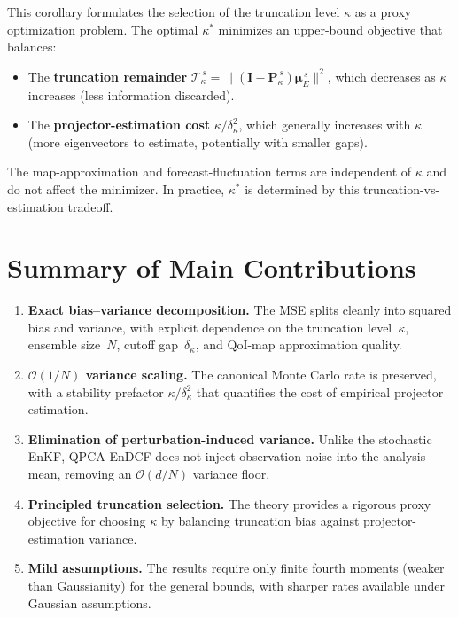 \documentclass[11pt]{article}
\begin{document}
This corollary formulates the selection of the truncation level $\kappa$ as a
proxy optimization problem. The optimal $\kappa^\ast$ minimizes an upper-bound
objective that balances:
\begin{itemize}
  \item The \textbf{truncation remainder}
    $\mathcal{T}_\kappa^{\,s} = \|(\mathbf{I} -
      \mathbf{P}_\kappa^{\,s})\boldsymbol{\mu}_E^{\,s}\|^2$,
    which decreases as $\kappa$ increases (less information discarded).
  \item The \textbf{projector-estimation cost}
    $\kappa / \delta_\kappa^2$, which generally increases with $\kappa$ (more
    eigenvectors to estimate, potentially with smaller gaps).
\end{itemize}
The map-approximation and forecast-fluctuation terms are independent of
$\kappa$ and do not affect the minimizer. In practice, $\kappa^\ast$ is
determined by this truncation-vs-estimation tradeoff.


\section*{Summary of Main Contributions}

\begin{enumerate}
  \item \textbf{Exact bias--variance decomposition.} The MSE splits cleanly
    into squared bias and variance, with explicit dependence on the truncation
    level~$\kappa$, ensemble size~$N$, cutoff gap~$\delta_\kappa$, and
    QoI-map approximation quality.

  \item \textbf{$\mathcal{O}(1/N)$ variance scaling.} The canonical Monte
    Carlo rate is preserved, with a stability prefactor
    $\kappa / \delta_\kappa^2$ that quantifies the cost of empirical projector
    estimation.

  \item \textbf{Elimination of perturbation-induced variance.} Unlike the
    stochastic EnKF, QPCA-EnDCF does not inject observation noise into the
    analysis mean, removing an $\mathcal{O}(d/N)$ variance floor.

  \item \textbf{Principled truncation selection.} The theory provides a
    rigorous proxy objective for choosing $\kappa$ by balancing truncation bias
    against projector-estimation variance.

  \item \textbf{Mild assumptions.} The results require only finite fourth
    moments (weaker than Gaussianity) for the general bounds, with sharper
    rates available under Gaussian assumptions.
\end{enumerate}
\end{document}
